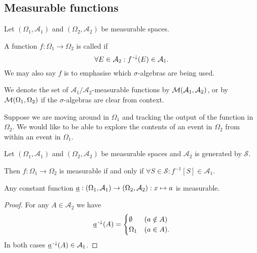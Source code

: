 \subsection{Measurable functions}
\begin{definition}
Let $(\Omega_1, \mathcal{A}_1)$ and $(\Omega_2, \mathcal{A}_2)$ be measurable spaces.

A function $f:\Omega_1 \to \Omega_2$ is called  if
\[ \forall E\in\mathcal{A}_2: f^{{\text{\hspace{0.15em}-}\downarrow}}(E) \in\mathcal{A}_1. \]
We may also say $f$ is  to emphasise which $\sigma$-algebras are being used.

We denote the set of $\mathcal{A}_1/\mathcal{A}_2$-measurable functions by $\operatorname{\mathcal{M}}(\mathcal{A}_1, \mathcal{A}_2)$, or by $\operatorname{\mathcal{M}}(\Omega_1, \Omega_2)$ if the $\sigma$-algebras are clear from context.
\end{definition}
Suppose we are moving around in $\Omega_1$ and tracking the output of the function in $\Omega_2$. We would like to be able to explore the contents of an event in $\Omega_2$ from within an event in $\Omega_1$.

\begin{lemma} \label{measurableFromGeneratingSet}
Let $(\Omega_1, \mathcal{A}_1)$ and $(\Omega_2, \mathcal{A}_2)$ be measurable spaces and $\mathcal{A}_2$ is generated by $\mathcal{S}$.

Then $f: \Omega_1\to \Omega_2$ is measurable \textup{if and only if} $\forall S\in\mathcal{S}: f^{-1}[S] \in \mathcal{A}_1$.
\end{lemma}

\begin{lemma} \label{constantFunctionsMeasurable}
Any constant function $\underline{a}: \sSet{\Omega_1,\mathcal{A}_1} \to \sSet{\Omega_2,\mathcal{A}_2}: x\mapsto a$ is measurable.
\end{lemma}
\begin{proof}
For any $A\in\mathcal{A}_2$ we have
\[ \underline{a}^{{\text{\hspace{0.15em}-}\downarrow}}(A) = \begin{cases}
\emptyset & (a\notin A) \\
\Omega_1 & (a\in A).
\end{cases} \]
In both cases $\underline{a}^{{\text{\hspace{0.15em}-}\downarrow}}(A)\in\mathcal{A}_1$.
\end{proof}

